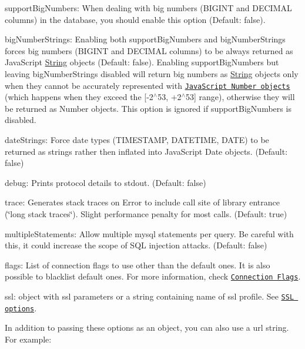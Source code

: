 \begin{DoxyItemize}
\item {\ttfamily support\+Big\+Numbers}\+: When dealing with big numbers (B\+I\+G\+I\+N\+T and D\+E\+C\+I\+M\+A\+L columns) in the database, you should enable this option (Default\+: {\ttfamily false}).
\item {\ttfamily big\+Number\+Strings}\+: Enabling both {\ttfamily support\+Big\+Numbers} and {\ttfamily big\+Number\+Strings} forces big numbers (B\+I\+G\+I\+N\+T and D\+E\+C\+I\+M\+A\+L columns) to be always returned as Java\+Script \hyperlink{class_string}{String} objects (Default\+: {\ttfamily false}). Enabling {\ttfamily support\+Big\+Numbers} but leaving {\ttfamily big\+Number\+Strings} disabled will return big numbers as \hyperlink{class_string}{String} objects only when they cannot be accurately represented with \href{http://ecma262-5.com/ELS5_HTML.htm#Section_8.5}{\tt Java\+Script Number objects} (which happens when they exceed the \mbox{[}-\/2$^\wedge$53, +2$^\wedge$53\mbox{]} range), otherwise they will be returned as Number objects. This option is ignored if {\ttfamily support\+Big\+Numbers} is disabled.
\item {\ttfamily date\+Strings}\+: Force date types (T\+I\+M\+E\+S\+T\+A\+M\+P, D\+A\+T\+E\+T\+I\+M\+E, D\+A\+T\+E) to be returned as strings rather then inflated into Java\+Script Date objects. (Default\+: {\ttfamily false})
\item {\ttfamily debug}\+: Prints protocol details to stdout. (Default\+: {\ttfamily false})
\item {\ttfamily trace}\+: Generates stack traces on {\ttfamily Error} to include call site of library entrance (\char`\"{}long stack traces\char`\"{}). Slight performance penalty for most calls. (Default\+: {\ttfamily true})
\item {\ttfamily multiple\+Statements}\+: Allow multiple mysql statements per query. Be careful with this, it could increase the scope of S\+Q\+L injection attacks. (Default\+: {\ttfamily false})
\item {\ttfamily flags}\+: List of connection flags to use other than the default ones. It is also possible to blacklist default ones. For more information, check \href{#connection-flags}{\tt Connection Flags}.
\item {\ttfamily ssl}\+: object with ssl parameters or a string containing name of ssl profile. See \href{#ssl-options}{\tt S\+S\+L options}.
\end{DoxyItemize}

In addition to passing these options as an object, you can also use a url string. For example\+:


